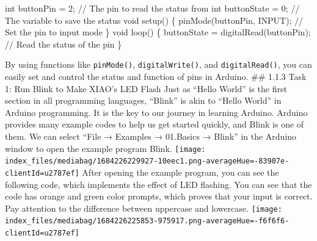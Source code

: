 \documentclass[
  letterpaper,
  DIV=11,
  numbers=noendperiod]{scrreprt}
\newenvironment{Shaded}{\begin{snugshade}}{\end{snugshade}}
\newcommand{\CommentTok}[1]{\textcolor[rgb]{0.37,0.37,0.37}{#1}}
\newcommand{\DataTypeTok}[1]{\textcolor[rgb]{0.68,0.00,0.00}{#1}}
\newcommand{\DecValTok}[1]{\textcolor[rgb]{0.68,0.00,0.00}{#1}}
\newcommand{\NormalTok}[1]{\textcolor[rgb]{0.00,0.23,0.31}{#1}}
\newcommand{\OperatorTok}[1]{\textcolor[rgb]{0.37,0.37,0.37}{#1}}
\begin{document}
\begin{Shaded}
\begin{Highlighting}[]
\DataTypeTok{int}\NormalTok{ buttonPin }\OperatorTok{=} \DecValTok{2}\OperatorTok{;} \CommentTok{// The pin to read the status from}
\DataTypeTok{int}\NormalTok{ buttonState }\OperatorTok{=} \DecValTok{0}\OperatorTok{;} \CommentTok{// The variable to save the status}
\DataTypeTok{void}\NormalTok{ setup}\OperatorTok{()} \OperatorTok{\{}
\NormalTok{    pinMode}\OperatorTok{(}\NormalTok{buttonPin}\OperatorTok{,}\NormalTok{ INPUT}\OperatorTok{);} \CommentTok{// Set the pin to input mode}
\OperatorTok{\}}
\DataTypeTok{void}\NormalTok{ loop}\OperatorTok{()} \OperatorTok{\{}
\NormalTok{    buttonState }\OperatorTok{=}\NormalTok{ digitalRead}\OperatorTok{(}\NormalTok{buttonPin}\OperatorTok{);} \CommentTok{// Read the status of the pin}
\OperatorTok{\}}
\end{Highlighting}
\end{Shaded}

By using functions like \texttt{pinMode()}, \texttt{digitalWrite()}, and
\texttt{digitalRead()}, you can easily set and control the status and
function of pins in Arduino. \#\# 1.1.3 Task 1: Run Blink to Make XIAO's
LED Flash Just as ``Hello World'' is the first section in all
programming languages, ``Blink'' is akin to ``Hello World'' in Arduino
programming. It is the key to our journey in learning Arduino. Arduino
provides many example codes to help us get started quickly, and Blink is
one of them. We can select ``File → Examples → 01.Basics → Blink'' in
the Arduino window to open the example program Blink.
\texttt{[image: index\_files/mediabag/1684226229927-10eec1.png-averageHue=-83907e-clientId=u2787ef]}
After opening the example program, you can see the following code, which
implements the effect of LED flashing. You can see that the code has
orange and green color prompts, which proves that your input is correct.
Pay attention to the difference between uppercase and lowercase.
\texttt{[image: index\_files/mediabag/1684226225853-975917.png-averageHue=-f6f6f6-clientId=u2787ef]}
\end{document}
